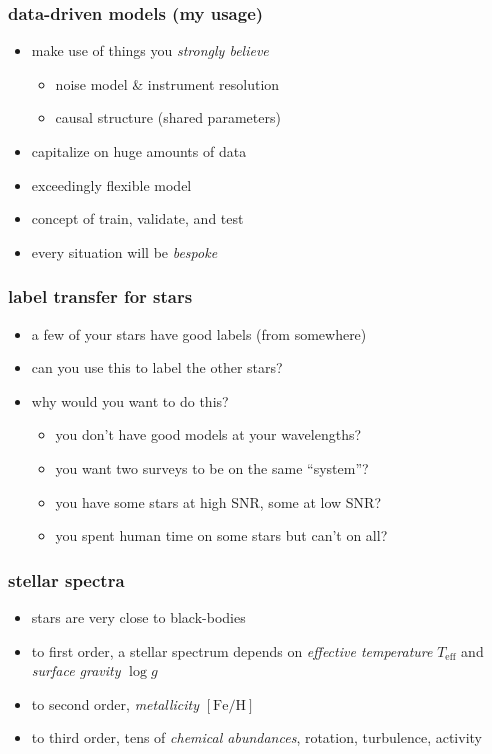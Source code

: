 \documentclass[pdftex]{beamer}
\newcommand{\teff}{T_{\mathrm{eff}}}
\newcommand{\logg}{\log g}
\newcommand{\feh}{[\mathrm{Fe / H}]}
\begin{document}
\begin{frame}
  \frametitle{data-driven models (my usage)}
  \begin{itemize}
  \item make use of things you \emph{strongly believe}
    \begin{itemize}
    \item noise model \& instrument resolution
    \item causal structure (shared parameters)
    \end{itemize}
  \item capitalize on huge amounts of data
  \item exceedingly flexible model
  \item concept of train, validate, and test
  \item every situation will be \emph{bespoke}
  \end{itemize}
\end{frame}

\begin{frame}
  \frametitle{label transfer for stars}
  \begin{itemize}
  \item a few of your stars have good labels (from somewhere)
  \item can you use this to label the other stars?
  \item why would you want to do this?
    \begin{itemize}
    \item<2> you don't have good models at your wavelengths?
    \item<2> you want two surveys to be on the same ``system''?
    \item<2> you have some stars at high SNR, some at low SNR?
    \item<2> you spent human time on some stars but can't on all?
    \end{itemize}
  \end{itemize}
\end{frame}

\begin{frame}
  \frametitle{stellar spectra}
  \begin{itemize}
  \item<1-> stars are very close to black-bodies
  \item<1-> to first order, a stellar spectrum depends on \emph{effective temperature} $\teff$ and \emph{surface gravity} $\logg$
  \item<2-> to second order, \emph{metallicity} $\feh$
  \item<3> to third order, tens of \emph{chemical abundances}, rotation, turbulence, activity
  \end{itemize}
\end{frame}
\end{document}
